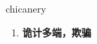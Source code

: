 
\begin{frame}
{\huge chicanery}
\begin{center}
\begin{enumerate}\Large
  \item \textbf{诡计多端，欺骗}
\end{enumerate}
\end{center}
\end{frame}
